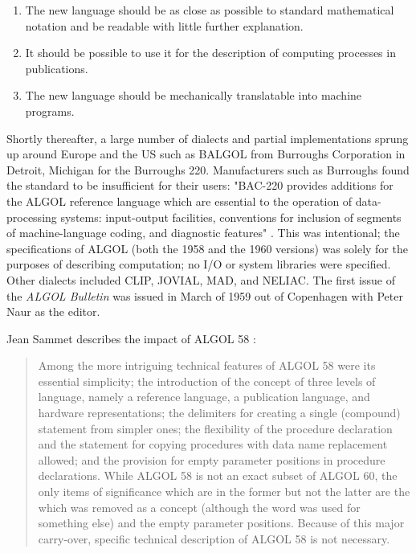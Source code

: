 \begin{enumerate}
\item The new language should be as close as possible to standard mathematical 
      notation and be readable with little further explanation.
\item It should be possible to use it for the description of computing processes in publications.
\item The new language should be mechanically translatable into machine programs.
\end{enumerate}

Shortly thereafter, a large number of dialects and partial implementations sprung up around Europe
and the US such as BALGOL from Burroughs Corporation in Detroit, Michigan for the Burroughs 220.
Manufacturers such as Burroughs found the standard to be insufficient for their users:
"BAC-220 provides additions for the ALGOL reference language which are essential to
the operation of data-processing systems: input-output
facilities, conventions for inclusion of segments of machine-language coding,
and diagnostic features" \cite{burroughs1963bac220}.
This was intentional; the specifications of ALGOL (both the 1958 and the 1960 versions)
was solely for the purposes of
describing computation; no I/O or system libraries were specified.
Other dialects included CLIP, JOVIAL, MAD, and NELIAC.
The first issue of the \textit{ALGOL Bulletin} was issued in March of 1959 out of Copenhagen
with Peter Naur as the editor.

Jean Sammet describes the impact of ALGOL 58
\cite{sammet_programming_languages_history_and_fundamentals_1969}:
\begin{quotation}
Among the more intriguing technical features of ALGOL 58 were its essential 
simplicity; the introduction of the concept of three levels of language, namely 
a reference language, a publication language, and hardware representations; the 
 delimiters for creating a single (compound) statement from simpler 
ones; the flexibility of the procedure declaration and the  statement for 
copying procedures with data name replacement allowed; and the provision for 
empty parameter positions in procedure declarations. While ALGOL 58 is not an 
exact subset of ALGOL 60, the only items of significance which are in the 
former but not the latter are the  which was removed as a concept (although 
the word was used for something else) and the empty parameter positions. 
Because of this major carry-over, specific technical description of ALGOL 58 is 
not necessary. 
\end{quotation}

